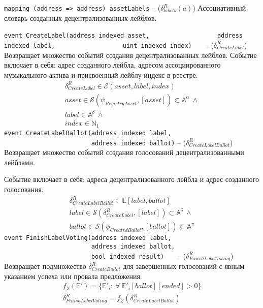 \documentclass[12pt]{report}
\def\code#1{\colorbox{light-gray}{\texttt{#1}}}
\begin{document}
\code{mapping (address => address) assetLabels} – ($\delta^R_{labels}(a)$)\hfill\null\linebreak
Ассоциативный словарь созданных децентрализованных лейблов.

\code{event CreateLabel(address indexed asset,}\hfill\null\linebreak
\code{~~~~~~~~~~~~~~~~~~address indexed label,}\hfill\null\linebreak
\code{~~~~~~~~~~~~~~~~~~uint indexed index)~~~} – ($\delta^R_{CreateLabel}$)\hfill\null\linebreak
Возвращает множество событий создания децентрализованных лейблов. Событие включает в себя: адрес созданного лейбла, адресом ассоциированного музыкального актива и присвоенный лейблу индекс в реестре.
\begin{equation}
\begin{aligned}
\delta^R_{CreateLabel} \in \mathcal{E}(asset, label, index) \\
asset \in \mathcal{S}(\psi_{RegistryAsset}, [asset]) \subset \mathbb{A}^\alpha \ \wedge \\
label \in \mathbb{A}^\delta \ \wedge \\
index \in \mathbb{N}_1
\end{aligned}
\end{equation}
\code{event CreateLabelBallot(address indexed label,~} \hfill\null\linebreak
\code{~~~~~~~~~~~~~~~~~~~~~~~~address indexed ballot)} – ($\delta^R_{CreateLabelBallot}$)\hfill\null\linebreak
Возвращает множество событий создания голосований децентрализованными лейблами. 

Событие включает в себя: адреса децентрализованного лейбла и адрес созданного голосования.
\begin{equation}
\begin{aligned}
\delta^R_{CreateLabelBallot} \in \mathbb{E}[label, ballot] \\
label \in \mathcal{S}(\delta^R_{CreateLabel}, [label]) \subset \mathbb{A}^\delta \ \wedge \\
ballot \in \mathcal{S}(\phi_{CreatedBallot}, [ballot]) \subset \mathbb{A}^\pi
\end{aligned}
\end{equation}
\code{event FinishLabelVoting(address indexed label,~}\hfill\null\linebreak
\code{~~~~~~~~~~~~~~~~~~~~~~~~address indexed ballot,}\hfill\null\linebreak
\code{~~~~~~~~~~~~~~~~~~~~~~~~bool indexed result)~~~} – ($\delta^R_{FinishLabelVoting}$)\hfill\null\linebreak
Возвращает подмножество $\delta^R_{CreateBallot}$ для завершенных  голосований с явным указанием успеха или провала предложения.
\begin{equation}
\begin{aligned}
f_Z(\mathbb{E}') = \{\mathbb{E}'_i : \ \forall \ \mathbb{E}'_i[ballot][ended] > 0 \} \\
\delta^R_{FinishLabelVoting} = f_Z(\delta^R_{CreateLabelBallot}) \\
\end{aligned}
\end{equation}
\end{document}
